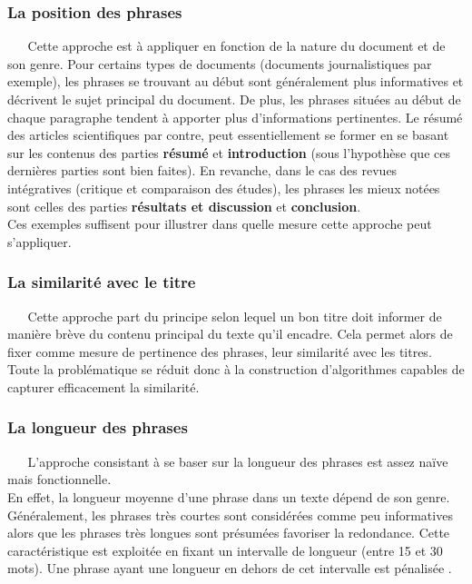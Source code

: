 \subsubsection{La position des phrases}
$ _{} $ $ _{} $ $ _{} $ $ _{} $ $ _{} $Cette approche est à appliquer en fonction de la nature du document et de son genre. Pour certains types de documents (documents journalistiques par exemple), les phrases se trouvant au début sont généralement plus informatives et décrivent le sujet principal du document. De plus, les phrases situées au début de chaque paragraphe tendent à apporter plus d'informations pertinentes. Le résumé des articles scientifiques par contre, peut essentiellement se former en se basant sur les contenus des parties \textbf{résumé} et \textbf{introduction} (sous l'hypothèse que ces dernières parties sont bien faites). En revanche, dans le cas des revues intégratives (critique et comparaison des études), les phrases les mieux notées sont celles des parties \textbf{résultats et discussion} et \textbf{conclusion}.\\
Ces exemples suffisent pour illustrer dans quelle mesure cette approche peut s'appliquer.
\subsubsection{La similarité avec le titre}
$ _{} $ $ _{} $ $ _{} $ $ _{} $ $ _{} $Cette approche part du principe selon lequel un bon titre doit informer de manière brève du contenu principal du texte qu'il encadre. Cela permet alors de fixer comme mesure de pertinence des phrases, leur similarité avec les titres. Toute la problématique se réduit donc à la construction d'algorithmes capables de capturer efficacement la similarité.
\subsubsection{La longueur des phrases}
$ _{} $ $ _{} $ $ _{} $ $ _{} $ $ _{} $L'approche consistant à se baser sur la longueur des phrases est assez naïve mais fonctionnelle.\\
En effet, la longueur moyenne d'une phrase dans un texte dépend de son genre. Gé\-né\-ra\-le\-ment, les phrases très courtes sont considérées comme peu informatives alors que les phrases très longues sont présumées favoriser la redondance. Cette caractéristique est exploitée en fixant un intervalle de longueur (entre 15 et 30 mots). Une phrase ayant une longueur en dehors de cet intervalle est pénalisée \cite{Schiffman2002}.
